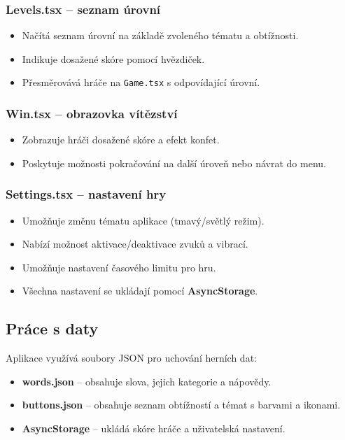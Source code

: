 \documentclass[a4paper,12pt]{article}
\begin{document}
\subsubsection{Levels.tsx – seznam úrovní}

\begin{itemize}
    \item Načítá seznam úrovní na základě zvoleného tématu a obtížnosti.
    \item Indikuje dosažené skóre pomocí hvězdiček.
    \item Přesměrovává hráče na \texttt{Game.tsx} s odpovídající úrovní.
\end{itemize}

\subsubsection{Win.tsx – obrazovka vítězství}

\begin{itemize}
    \item Zobrazuje hráči dosažené skóre a efekt konfet.
    \item Poskytuje možnosti pokračování na další úroveň nebo návrat do menu.
\end{itemize}

\subsubsection{Settings.tsx – nastavení hry}

\begin{itemize}
    \item Umožňuje změnu tématu aplikace (tmavý/světlý režim).
    \item Nabízí možnost aktivace/deaktivace zvuků a vibrací.
    \item Umožňuje nastavení časového limitu pro hru.
    \item Všechna nastavení se ukládají pomocí \textbf{AsyncStorage}.
\end{itemize}

\subsection{Práce s daty}

Aplikace využívá soubory JSON pro uchování herních dat:

\begin{itemize}
    \item \textbf{words.json} – obsahuje slova, jejich kategorie a nápovědy.
    \item \textbf{buttons.json} – obsahuje seznam obtížností a témat s barvami a ikonami.
    \item \textbf{AsyncStorage} – ukládá skóre hráče a uživatelská nastavení.
\end{itemize}
\end{document}
